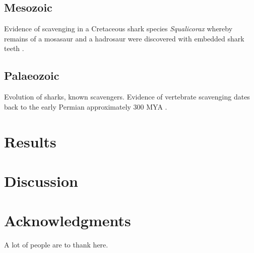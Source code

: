 \documentclass[a4paper,12pt]{article}
\begin{document}
\subsection*{Mesozoic}
Evidence of scavenging in a Cretaceous shark species \textit{Squalicorax} whereby remains of a mosasaur and a hadrosaur were discovered with embedded shark teeth \citep{schwimmer1997scavenging}. 
\subsection*{Palaeozoic}
Evolution of sharks, known scavengers. 
Evidence of vertebrate scavenging dates back to the early Permian approximately 300 MYA \citep{reisz2006articulated}.




\section*{Results}




\section*{Discussion}



\section*{Acknowledgments}

A lot of people are to thank here.


\newpage



\end{document}
